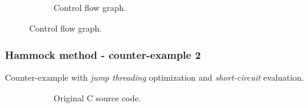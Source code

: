 \documentclass[aspectratio=1610]{beamer}
\begin{document}
\begin{frame}
\begin{figure}[htbp]
\begin{subfigure}[b]{0.50\textwidth}
			\caption{Control flow graph.}
		\end{subfigure}
	\end{figure}
\end{frame}

\begin{frame}[noframenumbering]
	\frametitle{Hammock method - counter-example 2}
	Counter-example with \textit{jump threading} optimization and \textit{short-circuit} evaluation.
	\begin{figure}[htbp]
		\centering
		\begin{subfigure}[b]{0.30\textwidth}
			\centering
			
			\caption{Original C source code.}
		\end{subfigure}
		\begin{subfigure}[b]{0.50\textwidth}
			\centering

\end{subfigure}
\end{figure}
\end{frame}
\end{document}
